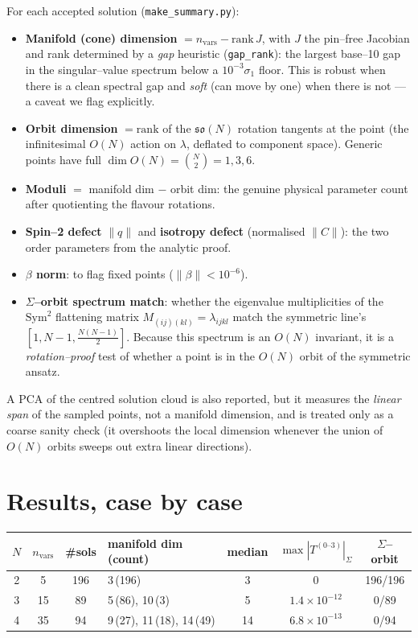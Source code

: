 \documentclass[11pt]{article}
\newcommand{\Sym}{\mathrm{Sym}}
\newcommand{\norm}[1]{\lVert #1\rVert}
\newcommand{\code}[1]{\texttt{#1}}
\begin{document}
For each accepted solution (\code{make\_summary.py}):
\begin{itemize}
\item \textbf{Manifold (cone) dimension} $=n_{\mathrm{vars}}-\mathrm{rank}\,J$,
with $J$ the pin--free Jacobian and rank determined by a \emph{gap} heuristic
(\code{gap\_rank}): the largest base--10 gap in the singular--value spectrum
below a $10^{-3}\sigma_1$ floor. This is robust when there is a clean spectral
gap and \emph{soft} (can move by one) when there is not --- a caveat we flag
explicitly.
\item \textbf{Orbit dimension} $=\mathrm{rank}$ of the
$\mathfrak{so}(N)$ rotation tangents at the point (the infinitesimal $O(N)$
action on $\lambda$, deflated to component space). Generic points have full
$\dim O(N)=\binom N2 = 1,3,6$.
\item \textbf{Moduli} $=$ manifold dim $-$ orbit dim: the genuine physical
parameter count after quotienting the flavour rotations.
\item \textbf{Spin--2 defect} $\norm{q}$ and \textbf{isotropy defect}
(normalised $\norm{C}$): the two order parameters from the analytic proof.
\item \textbf{$\beta$ norm}: to flag fixed points ($\norm\beta<10^{-6}$).
\item \textbf{$\Sigma$--orbit spectrum match}: whether the eigenvalue
multiplicities of the $\Sym^2$ flattening matrix $M_{(ij)(kl)}=\lambda_{ijkl}$
match the symmetric line's $[1,N{-}1,\tfrac{N(N-1)}2]$. Because this spectrum
is an $O(N)$ invariant, it is a \emph{rotation--proof} test of whether a point
is in the $O(N)$ orbit of the symmetric ansatz.
\end{itemize}
A PCA of the centred solution cloud is also reported, but it measures the
\emph{linear span} of the sampled points, not a manifold dimension, and is
treated only as a coarse sanity check (it overshoots the local dimension
whenever the union of $O(N)$ orbits sweeps out extra linear directions).

\section{Results, case by case}
\label{sec:results}

\begin{center}\begin{tabular}{ccclccc}\toprule
$N$ & $n_{\mathrm{vars}}$ & \#sols & manifold dim (count) & median &
$\max|T^{(0\text{--}3)}|_\Sigma$ & $\Sigma$--orbit \\ \midrule
2 & 5  & 196 & 3\,(196)            & 3  & $0$                  & 196/196 \\
3 & 15 & 89  & 5\,(86), 10\,(3)    & 5  & $1.4\times10^{-12}$  & 0/89 \\
4 & 35 & 94  & 9\,(27), 11\,(18), 14\,(49) & 14 & $6.8\times10^{-13}$ & 0/94 \\
\bottomrule\end{tabular}\end{center}
\end{document}
